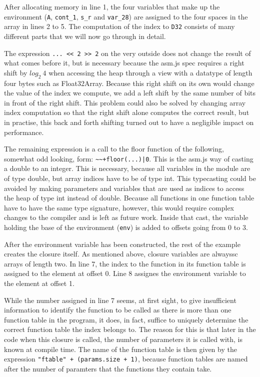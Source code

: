 \documentclass[11pt]{report}
\begin{document}
After allocating memory in line 1, the four variables that make up the environment (\texttt{A}, \texttt{cont_1}, \texttt{s_r} and \texttt{var_28}) are assigned to the four spaces in the array in lines 2 to 5. The computation of the index to \texttt{D32} consists of many different parts that we will now go through in detail.

The expression \texttt{... {<}< 2 {>}> 2} on the very outside does not change the result of what comes before it, but is necessary because the asm.js spec requires a right shift by $log_2~4$ when accessing the heap through a view with a datatype of length four bytes such as Float32Array. Because this right shift on its own would change the value of the index we compute, we add a left shift by the same number of bits in front of the right shift. This problem could also be solved by changing array index computation so that the right shift alone computes the correct result, but in practise, this back and forth shifting turned out to have a negligible impact on performance.

The remaining expression is a call to the floor function of the following, somewhat odd looking, form: \texttt{\textasciitilde\textasciitilde+floor(...)|0}. This is the asm.js way of casting a double to an integer. This is necessary, because all variables in the module are of type double, but array indices have to be of type int. This typecasting could be avoided by making parameters and variables that are used as indices to access the heap of type int instead of double. Because all functions in one function table have to have the same type signature, however, this would require complex changes to the compiler and is left as future work. Inside that cast, the variable holding the base of the environment (\texttt{env}) is added to offsets going from $0$ to $3$. 

After the environment variable has been constructed, the rest of the example creates the closure itself. As mentioned above, closure variables are alwayssc arrays of length two. In line 7, the index to the function in its function table is assigned to the element at offset 0. Line 8 assignes the environment variable to the element at offset 1.

While the number assigned in line 7 seems, at first sight, to give insufficient information to identify the function to be called as there is more than one function table in the program, it does, in fact, suffice to uniquely determine the correct function table the index belongs to. The reason for this is that later in the code when this closure is called, the number of parameters it is called with, is known at compile time. The name of the function table is then given by the expression \texttt{"ftable" + (params.size + 1)}, because function tables are named after the number of paramters that the functions they contain take.
\end{document}
